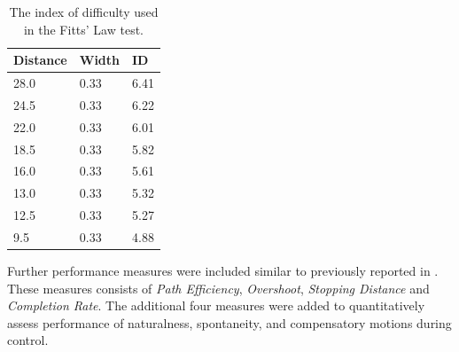 \vspace{5cm}
\begin{table}[H]
	\centering
	\caption{The index of difficulty used in the Fitts' Law test.}
	\label{tab:P:ID}
	\begin{tabular}{lll}
		
		Distance		 & Width	         & ID				   \\ \hline \hline
		28.0     & 0.33 & 6.41                \\ %
		24.5     & 0.33 & 6.22                \\ %
		22.0     & 0.33 & 6.01                \\ %
		18.5     & 0.33 & 5.82                \\ %
		16.0     & 0.33 & 5.61                \\ %
		13.0     & 0.33 & 5.32                \\ %
		12.5     & 0.33 & 5.27                \\ %
		9.5      & 0.33 & 4.88                \\ \hline \hline
	\end{tabular}
\end{table}

Further performance measures were included similar to previously reported in \cite{Scheme2013, Scheme2013a}. These measures consists of \textit{Path Efficiency}, \textit{Overshoot}, \textit{Stopping Distance} and \textit{Completion Rate}. The additional four measures were added to quantitatively assess performance of naturalness, spontaneity, and compensatory motions during control.  